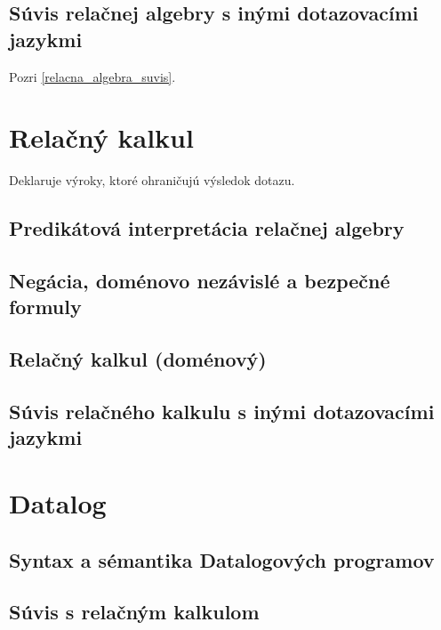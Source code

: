 \documentclass[10pt,a4paper]{article}
\begin{document}
\subsection{Súvis relačnej algebry s inými dotazovacími jazykmi}
Pozri \ref{relacna_algebra_suvis}.
    
\section{Relačný kalkul} 
\label{relacny_kalkul}

Deklaruje výroky, ktoré ohraničujú výsledok dotazu. 

\subsection{Predikátová interpretácia relačnej algebry}


\subsection{Negácia, doménovo nezávislé a bezpečné formuly}
\subsection{Relačný kalkul (doménový)}
\subsection{Súvis relačného kalkulu s inými dotazovacími jazykmi}
    
\section{Datalog} 
\subsection{Syntax a sémantika Datalogových programov}
\subsection{Súvis s relačným kalkulom}
\end{document}
